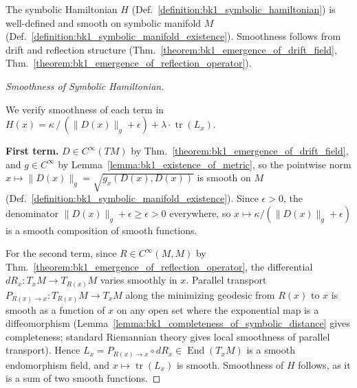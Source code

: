\begin{lemma}
\label{lemma:bk1_well_posedness_of_symbolic_hamiltonian}
\leavevmode\newline
The symbolic Hamiltonian $H$
(Def.~\ref{definition:bk1_symbolic_hamiltonian}) is well-defined and smooth on
symbolic manifold $M$
(Def.~\ref{definition:bk1_symbolic_manifold_existence}).
Smoothness follows from drift and reflection structure
(Thm.~\ref{theorem:bk1_emergence_of_drift_field},
Thm.~\ref{theorem:bk1_emergence_of_reflection_operator}).
\begin{proof}[Smoothness of Symbolic Hamiltonian]
\label{proof:bk1_sketch_smoothness_linearization}
\leavevmode

We verify smoothness of each term in
$H(x) = \kappa\,/\,(\|D(x)\|_g + \epsilon) + \lambda\cdot\operatorname{tr}(L_x)$.

\textbf{First term.}
$D \in C^\infty(TM)$ by Thm.~\ref{theorem:bk1_emergence_of_drift_field}, and
$g \in C^\infty$ by Lemma~\ref{lemma:bk1_existence_of_metric}, so the pointwise norm
$x \mapsto \|D(x)\|_g = \sqrt{g_x(D(x),D(x))}$ is smooth on $M$
(Def.~\ref{definition:bk1_symbolic_manifold_existence}).
Since $\epsilon > 0$, the denominator $\|D(x)\|_g + \epsilon \geq \epsilon > 0$ everywhere,
so $x \mapsto \kappa/(\|D(x)\|_g + \epsilon)$ is a smooth composition of smooth functions.

For the second term, since $R \in C^\infty(M,M)$ by Thm.~\ref{theorem:bk1_emergence_of_reflection_operator}, the
differential $dR_x: T_xM \to T_{R(x)}M$ varies smoothly in $x$.
Parallel transport $P_{R(x)\to x}: T_{R(x)}M \to T_xM$ along the minimizing geodesic
from $R(x)$ to $x$ is smooth as a function of $x$ on any open set where the exponential
map is a diffeomorphism (Lemma~\ref{lemma:bk1_completeness_of_symbolic_distance} gives
completeness; standard Riemannian theory gives local smoothness of parallel transport).
Hence $L_x = P_{R(x)\to x} \circ dR_x \in \operatorname{End}(T_xM)$ is a smooth
endomorphism field, and $x \mapsto \operatorname{tr}(L_x)$ is smooth.
Smoothness of $H$ follows, as it is a sum of two smooth functions.
\end{proof}
\end{lemma}
